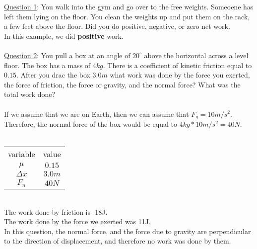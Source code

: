 \documentclass[]{article}
\date{}
\title{\docTitle}
\author{\docAuthor}
\date{\today}
\begin{document}
\maketitle
\underline{Question 1}: You walk into the gym and go over to the free weights. Someoene has left them lying on the floor. You clean the weights up and put them on the rack, a few feet above the floor. Did you do positive, negative, or zero net work.\\
In this example, we did \textbf{positive} work.\\
\\
\underline{Question 2}: You pull a box at an angle of $20^{\circ}$ above the horizontal across a level floor. The box has a mass of $4kg$. There is a coefficient of kinetic friction equal to $0.15$. After you drac the box $3.0m$ what work was done by the forec you exerted, the force of friction, the force or gravity, and the normal force? What was the total work done?\\
\\
If we assume that we are on Earth, then we can assume that $F_g = 10m/s^2$. Therefore, the normal force of the box would be equal to $4kg * 10m/s^2 = 40N$.\\\\
\begin{tabular}{|c|c|}
    variable & value\\
    $\mu$ & $0.15$\\
    $\Delta x$ & $3.0m$\\
    $F_n$ & $40N$\\
    
\end{tabular}\\
The work done by friction is -18J.\\
The work done by the force we exerted was 11J.\\
In this question, the normal force, and the force due to gravity are perpendicular to the direction of displacement, and therefore no work was done by them.
\end{document}
